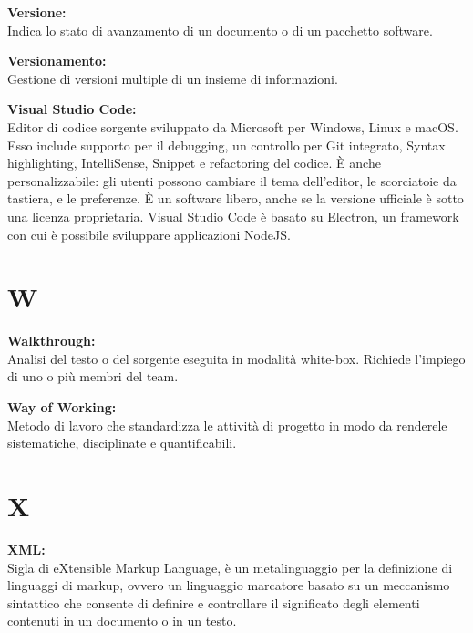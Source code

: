 \documentclass[a4paper, oneside, openany, dvipsnames, table]{article}
\begin{document}
\textbf{Versione:}\\ Indica lo stato di avanzamento di un documento o di un pacchetto software.

\textbf{Versionamento:}\\	Gestione di versioni multiple di un insieme di informazioni.

\textbf{Visual Studio Code:}\\	Editor di codice sorgente sviluppato da Microsoft per Windows, Linux e macOS. Esso include supporto per il debugging, un controllo per Git integrato, Syntax highlighting, IntelliSense, Snippet e refactoring del codice. È anche personalizzabile: gli utenti possono cambiare il tema dell'editor,  le scorciatoie da tastiera, e le preferenze. È un software libero, anche se la versione ufficiale è sotto una licenza proprietaria. Visual Studio Code è basato su Electron, un framework con cui è possibile sviluppare applicazioni NodeJS.


\newpage
\section{W}
\textbf{Walkthrough:}\\
Analisi del testo o del sorgente eseguita in modalità white-box. Richiede l'impiego di uno o più membri del team.

\textbf{Way of Working:}\\
Metodo di lavoro che standardizza le attività di progetto in modo da renderele sistematiche, disciplinate
e quantificabili.

\newpage
\section{X}
\textbf{XML:}\\
Sigla di eXtensible Markup Language, è un metalinguaggio per la definizione di linguaggi di markup, ovvero un linguaggio marcatore basato su un meccanismo sintattico che consente di definire e controllare il significato degli elementi contenuti in un documento o in un testo.
\end{document}
